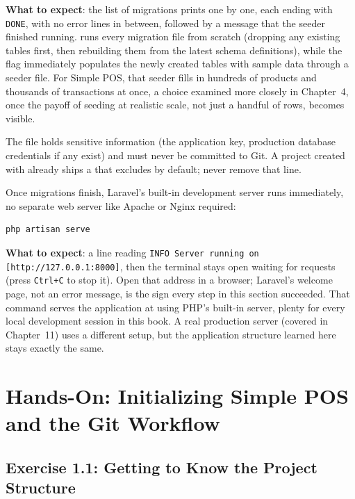 \textbf{What to expect}: the list of migrations prints one by one, each
ending with \texttt{DONE}, with no error lines in between, followed by a
message that the seeder finished running.  runs every migration file from scratch (dropping
any existing tables first, then rebuilding them from the latest schema
definitions), while the  flag immediately populates the newly
created tables with sample data through a seeder file. For Simple POS, that
seeder fills in hundreds of products and thousands of transactions at once,
a choice examined more closely in Chapter~4, once the payoff of seeding at
realistic scale, not just a handful of rows, becomes visible.

\begin{warningbox}
The  file holds sensitive information (the application key,
production database credentials if any exist) and must never be committed
to Git. A project created with  already ships
a  that excludes  by default; never remove that
line.
\end{warningbox}

Once migrations finish, Laravel's built-in development server runs
immediately, no separate web server like Apache or Nginx required:

\begin{lstlisting}[language=bash]
php artisan serve
\end{lstlisting}

\textbf{What to expect}: a line reading \texttt{INFO Server running on
[http://127.0.0.1:8000]}, then the terminal stays open waiting for
requests (press \texttt{Ctrl+C} to stop it). Open that address in a
browser; Laravel's welcome page, not an error message, is the sign every
step in this section succeeded. That command serves the application at  using
PHP's built-in server, plenty for every local development session in this
book. A real production server (covered in Chapter~11) uses a different
setup, but the application structure learned here stays exactly the same.

\section{Hands-On: Initializing Simple POS and the Git Workflow}
\label{sec:arsitektur-web-modern-3}

\subsection*{Exercise 1.1: Getting to Know the Project Structure}

